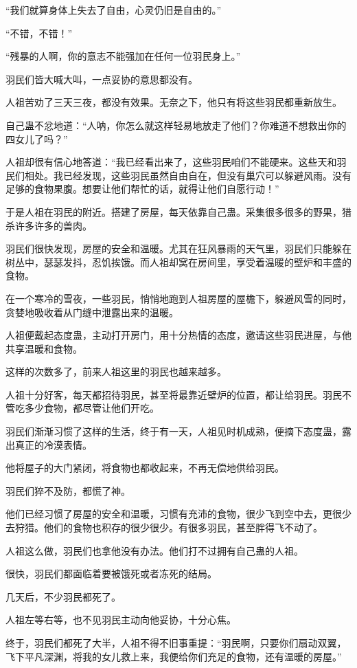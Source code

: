 \begin{this_body}
“我们就算身体上失去了自由，心灵仍旧是自由的。”

“不错，不错！”

“残暴的人啊，你的意志不能强加在任何一位羽民身上。”

羽民们皆大喊大叫，一点妥协的意思都没有。

人祖苦劝了三天三夜，都没有效果。无奈之下，他只有将这些羽民都重新放生。

自己蛊不忿地道：“人呐，你怎么就这样轻易地放走了他们？你难道不想救出你的四女儿了吗？”

人祖却很有信心地答道：“我已经看出来了，这些羽民咱们不能硬来。这些天和羽民们相处。我已经发现，这些羽民虽然自由自在，但没有巢穴可以躲避风雨。没有足够的食物果腹。想要让他们帮忙的话，就得让他们自愿行动！”

于是人祖在羽民的附近。搭建了房屋，每天依靠自己蛊。采集很多很多的野果，猎杀许多许多的兽肉。

羽民们很快发现，房屋的安全和温暖。尤其在狂风暴雨的天气里，羽民们只能躲在树丛中，瑟瑟发抖，忍饥挨饿。而人祖却窝在房间里，享受着温暖的壁炉和丰盛的食物。

在一个寒冷的雪夜，一些羽民，悄悄地跑到人祖房屋的屋檐下，躲避风雪的同时，贪婪地吸收着从门缝中泄露出来的温暖。

人祖便戴起态度蛊，主动打开房门，用十分热情的态度，邀请这些羽民进屋，与他共享温暖和食物。

这样的次数多了，前来人祖这里的羽民也越来越多。

人祖十分好客，每天都招待羽民，甚至将最靠近壁炉的位置，都让给羽民。羽民不管吃多少食物，都尽管让他们开吃。

羽民们渐渐习惯了这样的生活，终于有一天，人祖见时机成熟，便摘下态度蛊，露出真正的冷漠表情。

他将屋子的大门紧闭，将食物也都收起来，不再无偿地供给羽民。

羽民们猝不及防，都慌了神。

他们已经习惯了房屋的安全和温暖，习惯有充沛的食物，很少飞到空中去，更很少去狩猎。他们的食物也积存的很少很少。有很多羽民，甚至胖得飞不动了。

人祖这么做，羽民们也拿他没有办法。他们打不过拥有自己蛊的人祖。

很快，羽民们都面临着要被饿死或者冻死的结局。

几天后，不少羽民都死了。

人祖左等右等，也不见羽民主动向他妥协，十分心焦。

终于，羽民们都死了大半，人祖不得不旧事重提：“羽民啊，只要你们扇动双翼，飞下平凡深渊，将我的女儿救上来，我便给你们充足的食物，还有温暖的房屋。”


\end{this_body}
